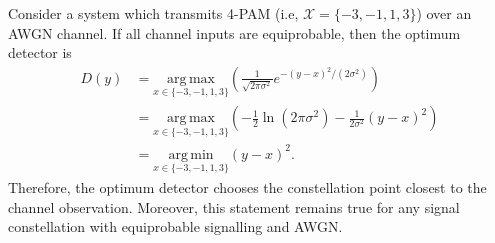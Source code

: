 \begin{example}
Consider a system which transmits 4-PAM (i.e, $\mathcal{X}=\{-3,-1,1,3\}$) over an AWGN channel.
If all channel inputs are equiprobable, then the optimum detector is
\begin{align*}
D(y)
& =  \underset{x\in\{-3,-1,1,3\}}{\mathrm{arg\,max}} \left( \frac{1}{\sqrt{2\pi \sigma^2}} e^{-(y-x)^2 / (2\sigma^2)} \right) \\
& =  \underset{x\in\{-3,-1,1,3\}}{\mathrm{arg\,max}} \left(-\frac{1}{2}\ln(2\pi \sigma^2) - \frac{1}{2\sigma^2} (y-x)^2 \right) \\
& =  \underset{x\in\{-3,-1,1,3\}}{\mathrm{arg\,min}} (y-x)^2. 
\end{align*}
Therefore, the optimum detector chooses the constellation point closest to the channel observation.
Moreover, this statement remains true for any signal constellation with equiprobable signalling and AWGN.
\end{example}

